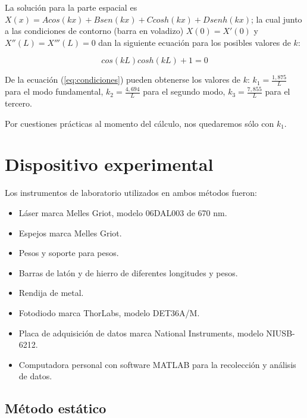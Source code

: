 \documentclass[twoside,twocolumn,a4paper]{article}
\begin{document}
La soluci\'on para la parte espacial es $X(x) = Acos(kx) + Bsen(kx) + Ccosh(kx) + Dsenh(kx)$; la cual junto a las condiciones de contorno (barra en voladizo) $X(0) = X'(0)$ y $X''(L) = X'''(L) = 0$ dan la siguiente ecuaci\'on para los posibles valores de $k$:

\begin{equation}
\label{eq:condiciones}
cos(kL)cosh(kL) + 1 = 0
\end{equation}

De la ecuaci\'on (\ref{eq:condiciones}) pueden obtenerse los valores de $k$:  $k_{1} = \frac{1,875}{L}$ para el modo fundamental, $k_{2} = \frac{4,694}{L}$ para el segundo modo, $k_{3} = \frac{7,855}{L}$ para el tercero.

Por cuestiones pr\'acticas al momento del c\'alculo, nos quedaremos s\'olo con $k_{1}$.



\section{Dispositivo experimental}

Los instrumentos de laboratorio utilizados en ambos m\'etodos fueron:
\begin{itemize}
\item 
\label{Laser} L\'aser marca Melles Griot, modelo 06DAL003 de 670 nm.
\item Espejos marca Melles Griot.
\item Pesos y soporte para pesos.
\item Barras de lat\'on y de hierro de diferentes longitudes y pesos.
\item Rendija de metal.
\item Fotodiodo marca ThorLabs, modelo DET36A/M.
\item Placa de adquisici\'on de datos marca National Instruments, modelo NIUSB-6212.
\item Computadora personal con software MATLAB para la recolecci\'on y an\'alisis de datos.
\end{itemize}

\subsection{M\'etodo est\'atico}
\end{document}
